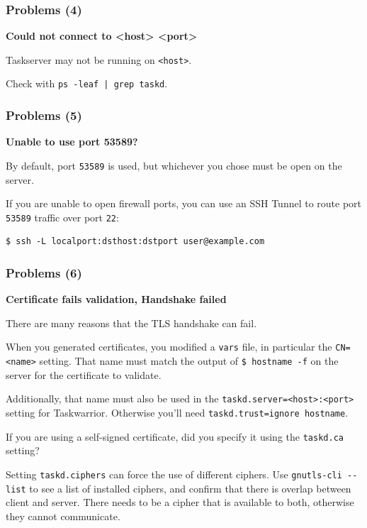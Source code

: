 \documentclass[t,handout]{beamer}
\begin{document}
\begin{frame}[fragile]\frametitle{Problems (4)}
    \textbf{Could not connect to <host> <port>}

    Taskserver may not be running on \verb+<host>+.

    Check with \verb+ps -leaf | grep taskd+.
\end{frame}

\begin{frame}[fragile]\frametitle{Problems (5)}
    \textbf{Unable to use port 53589?}

    By default, port \verb+53589+ is used, but whichever you chose must be open on the server.

    If you are unable to open firewall ports, you can use an SSH Tunnel to route port \verb+53589+ traffic over port \verb+22+:

    \begin{lstlisting}
$ ssh -L localport:dsthost:dstport user@example.com\end{lstlisting}
\end{frame}

\begin{frame}[fragile]\frametitle{Problems (6)}
    \textbf{Certificate fails validation, Handshake failed}

    There are many reasons that the TLS handshake can fail.

    When you generated certificates, you modified a \verb+vars+ file, in particular the \verb+CN=<name>+ setting. That name must match the output of  \verb+$ hostname -f+ on the server for the certificate to validate.

    Additionally, that name must also be used in the \verb+taskd.server=<host>:<port>+ setting for Taskwarrior. Otherwise you'll need \verb+taskd.trust=ignore hostname+.

    If you are using a self-signed certificate, did you specify it using the \verb+taskd.ca+ setting?

    Setting \verb+taskd.ciphers+ can force the use of different ciphers. Use \verb+gnutls-cli --list+ to see a list of installed ciphers, and confirm that there is overlap between client and server. There needs to be a cipher that is available to both, otherwise they cannot communicate.
\end{frame}
\end{document}
